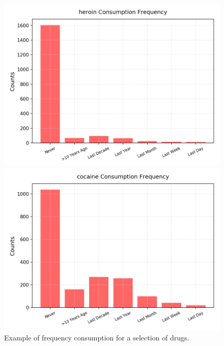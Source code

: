 \documentclass{article}
\begin{document}
\begin{figure}[h!]
\begin{minipage}[b]{0.32\textwidth}
\end{minipage}
\begin{minipage}[b]{0.32\textwidth}
	\includegraphics[width=\textwidth]{plots/drugsPlots/heroin_freq.png}
	
\end{minipage}
\begin{minipage}[b]{0.32\textwidth}
	\includegraphics[width=\textwidth]{plots/drugsPlots/cocaine_freq.png}
\end{minipage}

	\caption{Example of frequency consumption for a selection of drugs.}
\label{drugs1}
\end{figure}
\end{document}
